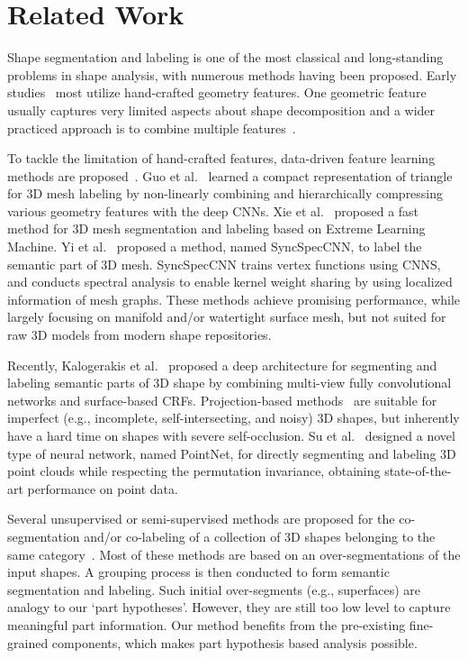 \documentclass[acmtog]{acmart}
\newcommand{\wang}[1]{{\color{black}#1}}
\begin{document}
 
\section{Related Work}
Shape segmentation and labeling is one of the most classical and long-standing problems
in shape analysis, with numerous methods having been proposed.
Early studies~\cite{Katz_SG03,Huang_EG09,Shapira_IJCV10,Zhang_TOG12,Au_TVCG12} most utilize
hand-crafted geometry features\wang{.}
One geometric feature usually captures very limited aspects about shape decomposition and
a wider practiced approach is to combine multiple features~\cite{Kalogerakis_SG10}.

To tackle the limitation of hand-crafted features,
data-driven feature learning methods are proposed~\cite{xu2016data}.
Guo et al.~ learned a compact representation
of triangle for 3D mesh labeling
by non-linearly combining and hierarchically compressing various geometry features with the deep CNNs.
Xie et al.~ proposed a fast method for 3D mesh segmentation and labeling
based on Extreme Learning Machine.
Yi et al.~ proposed a method, named SyncSpecCNN,
to label the semantic part of 3D mesh.
SyncSpecCNN trains vertex functions using CNNS,
and conducts spectral analysis to enable kernel weight sharing
by using localized information of mesh graphs.
These methods achieve promising performance,
while largely focusing on manifold and/or watertight surface mesh, but not suited for raw 3D models
from modern shape repositories.

Recently,
Kalogerakis et al.~ proposed a deep architecture for
segmenting and labeling semantic parts of 3D shape
by combining multi-view fully convolutional networks and surface-based CRFs.
Projection-based methods~\cite{Wang_SA13,Kalogerakis_CVPR17} are suitable for imperfect (e.g., incomplete, self-intersecting, and noisy) 3D shapes, but inherently have a hard time on shapes with severe self-occlusion.
Su et al.~ designed a novel type of neural network, named PointNet,
for directly segmenting and labeling 3D point clouds while
respecting the permutation invariance, obtaining state-of-the-art performance on point data.

Several unsupervised or semi-supervised methods are proposed
for the co-segmentation and/or co-labeling of a collection of 3D shapes belonging to the
same category~\cite{xu2010style,Huang_SA11,Sidi_SA11,Wang_SA12,Hu_SGP12,Lv_PG12,van_SG13}.
Most of these methods are based on an over-segmentations of the input shapes.
A grouping process is then conducted to form semantic segmentation and labeling.
Such initial over-segments (e.g., superfaces) are analogy to our `part hypotheses'.
However, they are still too low level to capture meaningful part information.
Our method benefits from the pre-existing fine-grained components, which makes part
hypothesis based analysis possible.
\end{document}
